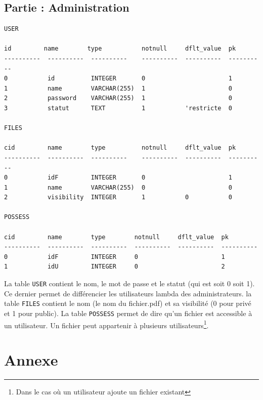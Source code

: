 \documentclass[a4paper, 12pt]{article}
\begin{document}
\subsection{Partie : Administration}
\begin{verbatim}
USER

id         name        type           notnull     dflt_value  pk        
----------  ----------  ----------    ----------  ----------  ----------
0           id          INTEGER       0                       1         
1           name        VARCHAR(255)  1                       0         
2           password    VARCHAR(255)  1                       0         
3           statut      TEXT          1           'restricte  0         

FILES

cid         name        type          notnull     dflt_value  pk        
----------  ----------  ----------    ----------  ----------  ----------
0           idF         INTEGER       0                       1         
1           name        VARCHAR(255)  0                       0         
2           visibility  INTEGER       1           0           0      

POSSESS

cid         name        type        notnull     dflt_value  pk        
----------  ----------  ----------  ----------  ----------  ----------
0           idF         INTEGER     0                       1         
1           idU         INTEGER     0                       2    
\end{verbatim}
La table \verb+USER+ contient le nom, le mot de passe et le statut (qui est soit 0 soit 1). Ce dernier permet de différencier les utilisateurs lambda des administrateurs. la table \verb+FILES+ contient le nom (le nom du fichier.pdf) et sa visibilité (0 pour privé et 1 pour public). La table \verb+POSSESS+ permet de dire qu'un fichier est accessible à un utilisateur. Un fichier peut appartenir à plusieurs utilisateurs\footnote{Dans le cas où un utilisateur ajoute un fichier existant}.
\newpage
\section*{Annexe}
\end{document}
